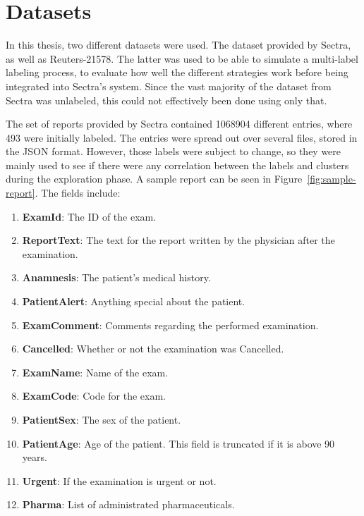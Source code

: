 \section{Datasets}\label{sec:datasets}
In this thesis, two different datasets were used.
The dataset provided by Sectra, as well as Reuters-21578.
The latter was used to be able to simulate a multi-label labeling process, to evaluate how well the different strategies work before being integrated into Sectra's system.
Since the vast majority of the dataset from Sectra was unlabeled, this could not effectively been done using only that.

The set of reports provided by Sectra contained 1068904 different entries, where 493 were initially labeled.
The entries were spread out over several files, stored in the JSON format.
However, those labels were subject to change, so they were mainly used to see if there were any correlation between the labels and clusters during the exploration phase.
A sample report can be seen in Figure~\ref{fig:sample-report}.
The fields include:
\begin{enumerate}
    \item \textbf{ExamId}: The ID of the exam.
    \item \textbf{ReportText}: The text for the report written by the physician after the examination.
    \item \textbf{Anamnesis}: The patient's medical history.
    \item \textbf{PatientAlert}: Anything special about the patient.
    \item \textbf{ExamComment}: Comments regarding the performed examination.
    \item \textbf{Cancelled}: Whether or not the examination was Cancelled.
    \item \textbf{ExamName}: Name of the exam.
    \item \textbf{ExamCode}: Code for the exam.
    \item \textbf{PatientSex}: The sex of the patient.
    \item \textbf{PatientAge}: Age of the patient. This field is truncated if it is above 90 years.
    \item \textbf{Urgent}: If the examination is urgent or not.
    \item \textbf{Pharma}: List of administrated pharmaceuticals.
\end{enumerate}
